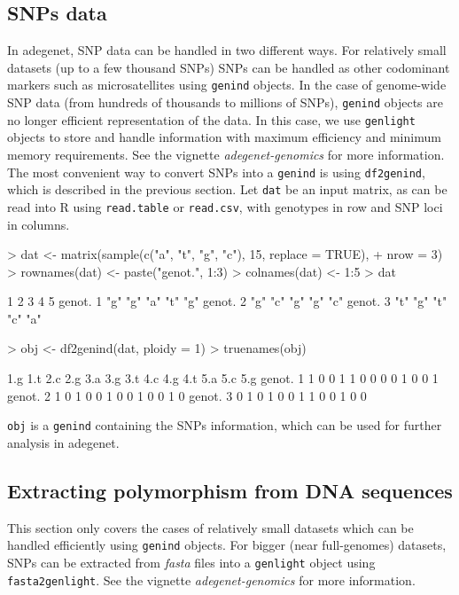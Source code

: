 \documentclass{article}
\begin{document}
\subsection{SNPs data}
In adegenet, SNP data can be handled in two different ways.
For relatively small datasets (up to a few thousand SNPs) SNPs can
be handled as other codominant markers such as microsatellites using \texttt{genind} objects.
In the case of genome-wide SNP data (from hundreds of thousands to millions of SNPs),
\texttt{genind} objects are no longer efficient representation of the data.
In this case, we use \texttt{genlight} objects to store and handle information with maximum
efficiency and minimum memory requirements. See the vignette \textit{adegenet-genomics} for more information.
\\

The most convenient way to convert SNPs into a \texttt{genind} is using \texttt{df2genind}, which is
described in the previous section.
Let \texttt{dat} be an input matrix, as can be read into R using \texttt{read.table} or \texttt{read.csv},
with genotypes in row and SNP loci in columns.
\begin{Schunk}
\begin{Sinput}
> dat <- matrix(sample(c("a", "t", "g", "c"), 15, replace = TRUE), 
+     nrow = 3)
> rownames(dat) <- paste("genot.", 1:3)
> colnames(dat) <- 1:5
> dat
\end{Sinput}
\begin{Soutput}
         1   2   3   4   5  
genot. 1 "g" "g" "a" "t" "g"
genot. 2 "g" "c" "g" "g" "c"
genot. 3 "t" "g" "t" "c" "a"
\end{Soutput}
\begin{Sinput}
> obj <- df2genind(dat, ploidy = 1)
> truenames(obj)
\end{Sinput}
\begin{Soutput}
         1.g 1.t 2.c 2.g 3.a 3.g 3.t 4.c 4.g 4.t 5.a 5.c 5.g
genot. 1   1   0   0   1   1   0   0   0   0   1   0   0   1
genot. 2   1   0   1   0   0   1   0   0   1   0   0   1   0
genot. 3   0   1   0   1   0   0   1   1   0   0   1   0   0
\end{Soutput}
\end{Schunk}

\texttt{obj} is a \texttt{genind} containing the SNPs information, which can be used for further
analysis in adegenet.



\subsection{Extracting polymorphism from DNA sequences}
This section only covers the cases of relatively small datasets which can be handled efficiently
using \texttt{genind} objects. For bigger (near full-genomes) datasets, SNPs can be extracted from
\textit{fasta} files into a \texttt{genlight} object using \texttt{fasta2genlight}.
See the vignette \textit{adegenet-genomics} for more information.
\\
\end{document}
